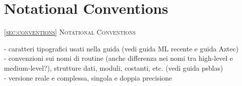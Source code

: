 \section{Notational Conventions\label{sec:conventions}}
         {\textsc{\ref{sec:conventions} Notational Conventions}}

    - caratteri tipografici usati nella guida (vedi guida ML recente e guida Aztec) \\
    - convenzioni sui nomi di routine (anche differenza nei nomi tra high-level e 	 
      medium-level?), strutture dati, moduli, costanti, etc. (vedi guida psblas) \\
    - versione reale e complessa, singola e doppia precisione\\